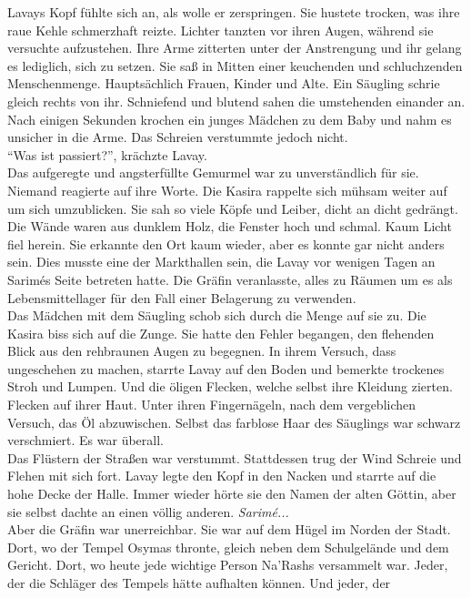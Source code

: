 Lavays Kopf fühlte sich an, als wolle er zerspringen. Sie hustete trocken, was ihre raue Kehle 
schmerzhaft reizte. Lichter tanzten vor ihren Augen, während sie versuchte aufzustehen. Ihre 
Arme zitterten unter der Anstrengung und ihr gelang es lediglich, sich zu setzen. Sie saß in Mitten 
einer keuchenden und schluchzenden Menschenmenge. Hauptsächlich Frauen, Kinder und Alte. Ein 
Säugling schrie gleich rechts von ihr. Schniefend und blutend sahen die umstehenden einander an. 
Nach einigen Sekunden krochen ein junges Mädchen zu dem Baby und nahm es unsicher in die Arme. Das 
Schreien verstummte jedoch nicht.\\
``Was ist passiert?'', krächzte Lavay.\\
Das aufgeregte und angsterfüllte Gemurmel war zu unverständlich für sie. Niemand reagierte auf ihre 
Worte. Die Kasira rappelte sich mühsam weiter auf um sich umzublicken. Sie sah so viele Köpfe 
und Leiber, dicht an dicht gedrängt. Die Wände waren aus dunklem Holz, die Fenster hoch und 
schmal. Kaum Licht fiel herein. Sie erkannte den Ort kaum wieder, aber es konnte gar nicht 
anders sein. Dies musste eine der Markthallen sein, die Lavay vor wenigen Tagen an Sarimés 
Seite betreten hatte. Die Gräfin veranlasste, alles zu Räumen um es als Lebensmittellager für 
den Fall einer Belagerung zu verwenden.\\
Das Mädchen mit dem Säugling schob sich durch die Menge auf sie zu. Die Kasira biss sich auf 
die Zunge. Sie hatte den Fehler begangen, den flehenden Blick aus den rehbraunen Augen zu 
begegnen. In ihrem Versuch, dass ungeschehen zu machen, starrte Lavay auf den Boden und bemerkte 
trockenes Stroh und Lumpen. Und die öligen Flecken, welche selbst ihre Kleidung zierten. Flecken 
auf ihrer Haut. Unter ihren Fingernägeln, nach dem vergeblichen Versuch, das Öl abzuwischen. 
Selbst das farblose Haar des Säuglings war schwarz verschmiert. Es war überall.\\
Das Flüstern der Straßen war verstummt. Stattdessen trug der Wind Schreie und Flehen mit sich fort. 
Lavay legte den Kopf in den Nacken und starrte auf die hohe Decke der Halle. Immer wieder hörte sie 
den Namen der alten Göttin, aber sie selbst dachte an einen völlig anderen. \textit{Sarimé...}\\
Aber die Gräfin war unerreichbar. Sie war auf dem Hügel im Norden der Stadt. Dort, wo der Tempel 
Osymas thronte, gleich neben dem Schulgelände und dem Gericht. Dort, wo heute jede wichtige Person 
Na'Rashs versammelt war. Jeder, der die Schläger des Tempels hätte aufhalten können. Und jeder, der 

